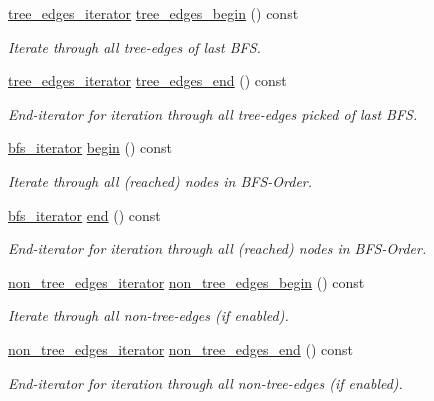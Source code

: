 \begin{DoxyCompactItemize}
\mbox{\hyperlink{classbfs_a04e608fe18089e5495cadb995aa75261}{tree\+\_\+edges\+\_\+iterator}} \mbox{\hyperlink{classbfs_a56959215efdfee1a37826ad315ac13e7}{tree\+\_\+edges\+\_\+begin}} () const
\begin{DoxyCompactList}\small\item\em Iterate through all tree-\/edges of last B\+FS. \end{DoxyCompactList}\item 
\mbox{\hyperlink{classbfs_a04e608fe18089e5495cadb995aa75261}{tree\+\_\+edges\+\_\+iterator}} \mbox{\hyperlink{classbfs_a7db47d5d68e21e95fd548beea1a8db2b}{tree\+\_\+edges\+\_\+end}} () const
\begin{DoxyCompactList}\small\item\em End-\/iterator for iteration through all tree-\/edges picked of last B\+FS. \end{DoxyCompactList}\item 
\mbox{\hyperlink{classbfs_a1035f068a96de0370789ec315aef4f73}{bfs\+\_\+iterator}} \mbox{\hyperlink{classbfs_aff214e6d33f7f2bbd899cf335540def9}{begin}} () const
\begin{DoxyCompactList}\small\item\em Iterate through all (reached) nodes in B\+F\+S-\/\+Order. \end{DoxyCompactList}\item 
\mbox{\hyperlink{classbfs_a1035f068a96de0370789ec315aef4f73}{bfs\+\_\+iterator}} \mbox{\hyperlink{classbfs_ac35b3d3c37d33eb80adb752e17a60df9}{end}} () const
\begin{DoxyCompactList}\small\item\em End-\/iterator for iteration through all (reached) nodes in B\+F\+S-\/\+Order. \end{DoxyCompactList}\item 
\mbox{\hyperlink{classbfs_a89ec32919076618d9eef18990fef543f}{non\+\_\+tree\+\_\+edges\+\_\+iterator}} \mbox{\hyperlink{classbfs_a06d02d2643f184b4c086678771f0ff90}{non\+\_\+tree\+\_\+edges\+\_\+begin}} () const
\begin{DoxyCompactList}\small\item\em Iterate through all non-\/tree-\/edges (if enabled). \end{DoxyCompactList}\item 
\mbox{\hyperlink{classbfs_a89ec32919076618d9eef18990fef543f}{non\+\_\+tree\+\_\+edges\+\_\+iterator}} \mbox{\hyperlink{classbfs_a9fb470cd36eb487004ca28c1723cabda}{non\+\_\+tree\+\_\+edges\+\_\+end}} () const
\begin{DoxyCompactList}\small\item\em End-\/iterator for iteration through all non-\/tree-\/edges (if enabled). \end{DoxyCompactList}\item 

\end{DoxyCompactItemize}
